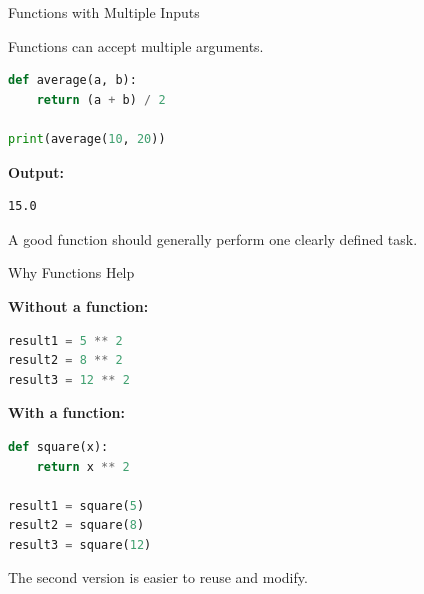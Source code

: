 \documentclass[aspectratio=43]{beamer}
\begin{document}
\begin{frame}[fragile]{Functions with Multiple Inputs}

Functions can accept multiple arguments.

\begin{lstlisting}[language=Python]
def average(a, b):
    return (a + b) / 2

print(average(10, 20))
\end{lstlisting}

\textbf{Output:}

\begin{lstlisting}
15.0
\end{lstlisting}

\vspace{0.2cm}

A good function should generally perform one clearly defined task.

\end{frame}

\begin{frame}[fragile]{Why Functions Help}

\textbf{Without a function:}

\begin{lstlisting}[language=Python]
result1 = 5 ** 2
result2 = 8 ** 2
result3 = 12 ** 2
\end{lstlisting}

\textbf{With a function:}

\begin{lstlisting}[language=Python]
def square(x):
    return x ** 2

result1 = square(5)
result2 = square(8)
result3 = square(12)
\end{lstlisting}

The second version is easier to reuse and modify.

\end{frame}
\end{document}
